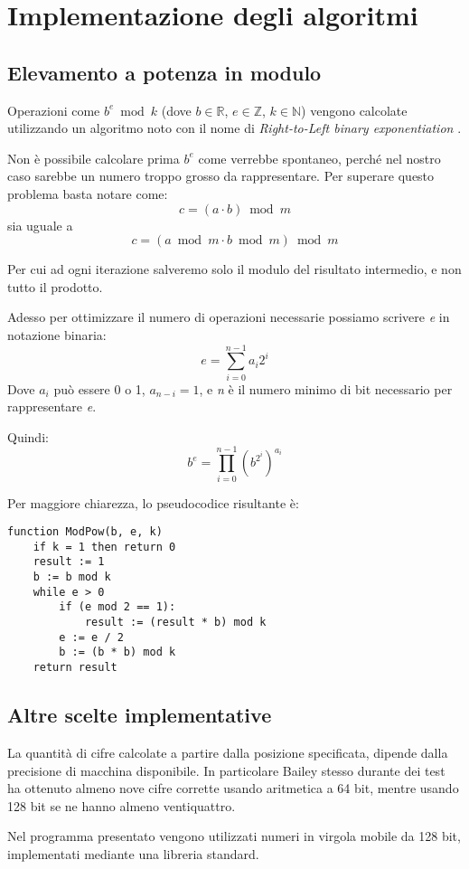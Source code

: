 \section{Implementazione degli algoritmi}
\label{sec:impl}
\subsection{Elevamento a potenza in modulo}
\label{sec:impl_pot}
Operazioni come $b^e\bmod{k}$ (dove $b \in \mathbb{R}$, $e \in \mathbb{Z}$, $k \in \mathbb{N}$) vengono calcolate utilizzando un algoritmo noto con il nome di \textit{Right-to-Left binary exponentiation} \cite[par. 4.6.3]{Knuth}.

Non è possibile calcolare prima $b^e$ come verrebbe spontaneo, perché nel nostro caso sarebbe un numero troppo grosso da rappresentare. Per superare questo problema basta notare come:
$$c = (a \cdot b)\bmod{m}$$
sia uguale a
$$c = (a\bmod{m} \cdot b\bmod{m})\bmod{m}$$

\noindent Per cui ad ogni iterazione salveremo solo il modulo del risultato intermedio, e non tutto il prodotto.

Adesso per ottimizzare il numero di operazioni necessarie possiamo scrivere \textit{e} in notazione binaria:
$$e = \sum\limits_{i=0}^{n-1} a_i 2^i$$
Dove $a_i$ può essere 0 o 1, $a_{n-i} = 1$, e \textit{n} è il numero minimo di bit necessario per rappresentare \textit{e}.

Quindi:
$$b^e = \prod\limits_{i=0}^{n-1} (b^{2^i})^{a_i}$$

\noindent Per maggiore chiarezza, lo pseudocodice risultante è:

\begin{mdframed}[backgroundcolor=bg]
\begin{verbatim}
function ModPow(b, e, k)
    if k = 1 then return 0
    result := 1
    b := b mod k
    while e > 0
        if (e mod 2 == 1):
            result := (result * b) mod k
        e := e / 2
        b := (b * b) mod k
    return result
\end{verbatim}
\end{mdframed}

\subsection{Altre scelte implementative}

La quantità di cifre calcolate a partire dalla posizione specificata, dipende dalla precisione di macchina disponibile. In particolare Bailey stesso durante dei test ha ottenuto almeno nove cifre corrette usando aritmetica a 64 bit, mentre usando 128 bit se ne hanno almeno ventiquattro. \cite[p.\ 4-5]{Bailey}
\newline

Nel programma presentato vengono utilizzati numeri in virgola mobile da 128 bit, implementati mediante una libreria standard.